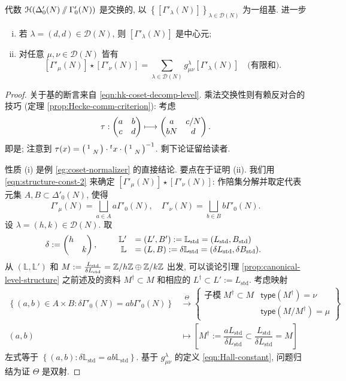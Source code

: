 \begin{theorem}\label{prop:Hall-Hecke-level}
	代数 $\EuScript{H}(\Delta'_0(N) \sslash \Gamma'_0(N))$ 是交换的, 以 $\left\{ \left[ \Gamma'_\lambda(N) \right] \right\}_{ \lambda \in \mathcal{D}(N)}$ 为一组基. 进一步
	\begin{enumerate}[(i)]
		\item 若 $\lambda = (d,d) \in \mathcal{D}(N)$, 则 $[\Gamma'_\lambda(N)]$ 是中心元;
		\item 对任意 $\mu, \nu \in \mathcal{D}(N)$ 皆有
		\[ [\Gamma'_\mu(N)] \star [\Gamma'_\nu(N)] = \sum_{\lambda \in \mathcal{D}(N)} g^\lambda_{\mu\nu} [\Gamma'_\lambda(N)] \quad \text{(有限和)}. \]
	\end{enumerate}
\end{theorem}
\begin{proof}
	关于基的断言来自 \eqref{eqn:hk-coset-decomp-level}. 乘法交换性则有赖反对合的技巧 (定理 \ref{prop:Hecke-comm-criterion}): 考虑
	\[ \tau: \begin{pmatrix} a & b \\ c & d \end{pmatrix} \longmapsto \begin{pmatrix} a & c/N \\ bN & d \end{pmatrix}. \]
	即是; 注意到 $\tau(x) = \bigl(\begin{smallmatrix} 1 &  \\  & N \end{smallmatrix}\bigr) \cdot {}^t x \cdot \bigl(\begin{smallmatrix} 1 &  \\  & N \end{smallmatrix}\bigr)^{-1}$. 剩下论证留给读者.

	性质 (i) 是例 \ref{eg:coset-normalizer} 的直接结论. 要点在于证明 (ii). 我们用 \eqref{eqn:structure-const-2} 来确定 $[\Gamma'_\mu(N)] \star [\Gamma'_\nu(N)]$: 作陪集分解并取定代表元集 $A, B \subset \Delta'_0(N)$, 使得
	\[ \Gamma'_\mu(N) = \bigsqcup_{a \in A} a \Gamma'_0(N), \quad \Gamma'_\nu(N) = \bigsqcup_{b \in B} b \Gamma'_0(N). \]
	设 $\lambda = (h,k) \in \mathcal{D}(N)$. 取
	\begin{gather*}
		\delta := \begin{pmatrix} h &  \\  & k \end{pmatrix}, \qquad
		\begin{array}{rl}
			\mathbb{L}' & = (L',B') := \mathbb{L}_{\text{std}} = (L_{\text{std}}, B_{\text{std}}) \\
			\mathbb{L} & = (L,B) := \delta\mathbb{L}_{\text{std}} = (\delta L_{\text{std}}, \delta B_{\text{std}}).
		\end{array}
	\end{gather*}
	从 $(\mathbb{L}, \mathbb{L}')$ 和 $M := \frac{L_{\mathrm{std}}}{\delta L_{\mathrm{std}}} = \mathbb{Z}/h\mathbb{Z} \oplus \mathbb{Z}/k\mathbb{Z}$ 出发, 可以谈论引理 \ref{prop:canonical-level-structure} 之前述及的资料 $M^\dagger \subset M$ 和相应的 $L^\dagger \subset L' := L_{\text{std}}$. 考虑映射
	\begin{align*}
		\left\{ (a,b) \in A \times B: \delta \Gamma'_0(N) = ab\Gamma'_0(N) \right\} & \stackrel{\Theta}{\longrightarrow} \left\{
		\begin{array}{r|l}
			\text{子模}\; M^\dagger \subset M & \mathsf{type}(M^\dagger) = \nu \\
			& \mathsf{type}(M/M^\dagger) = \mu
		\end{array}\right\} \\
		(a,b) & \longmapsto
			\left[
				M^\dagger := \dfrac{a L_{\text{std}}}{\delta L_{\text{std}}} \subset \dfrac{L_{\text{std}}}{\delta L_{\text{std}}} = M
			\right]
	\end{align*}
	左式等于 $\left\{(a,b) : \delta \mathbb{L}_{\text{std}} = ab \mathbb{L}_{\text{std}} \right\}$. 基于 $g^\lambda_{\mu\nu}$ 的定义 \eqref{eqn:Hall-constant}, 问题归结为证 $\Theta$ 是双射.
	

\end{proof}

